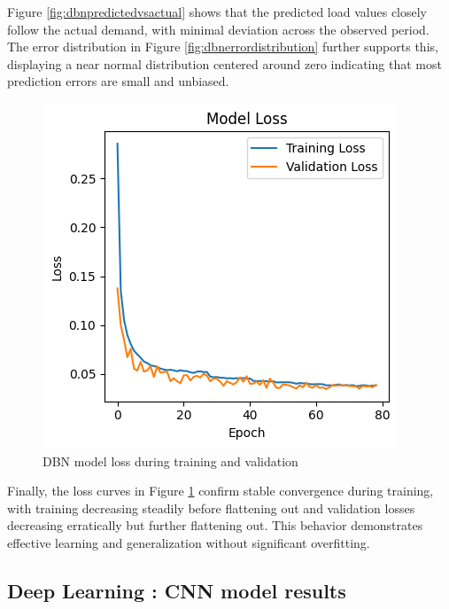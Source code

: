 Figure \ref{fig:dbnpredictedvsactual} shows that the predicted load values closely follow the actual demand, with minimal deviation across the observed period. The error distribution in Figure \ref{fig:dbnerrordistribution} further supports this, displaying a near normal distribution centered around zero indicating that most prediction errors are small and unbiased.  
  \begin{figure}[h!]
  	\centering
  	\includegraphics[width=0.4\linewidth]{"Chapters/images/results/dbn_validation loss"}
  	\caption{DBN model loss during training and validation}
  	\label{fig:dbnvalidation-loss}
  \end{figure}
  Finally, the loss curves in Figure \ref{fig:dbnvalidation-loss} confirm stable convergence during training, with training decreasing steadily before flattening out and validation losses decreasing erratically but further flattening out. This behavior demonstrates effective learning and generalization without significant overfitting.
  
 
 
 \subsection{Deep Learning : CNN model results}
 
